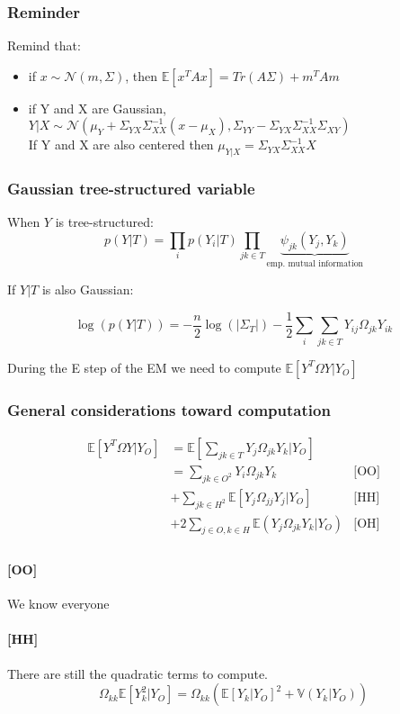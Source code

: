 \documentclass[11pt,a4paper]{article}
\newcommand{\Esp}{\mathds{E}}
\begin{document}
\subsubsection{Reminder}
Remind that:
\begin{itemize}
\item if $x\sim\mathcal{N}(m, \Sigma)$, then
$\Esp[x^TAx] = Tr(A\Sigma) + m^TAm$
\item if Y and X are Gaussian, $Y|X \sim \mathcal{N}(\mu_Y+\Sigma_{YX}\Sigma_{XX}^{-1}(x-\mu_X) , \Sigma_{YY} - \Sigma_{YX}\Sigma_{XX}^{-1}\Sigma_{XY})$\\
If Y and X are also centered then $\mu_{Y|X} = \Sigma_{YX}\Sigma_{XX}^{-1} X$
\end{itemize}


\subsubsection{Gaussian tree-structured variable}
When $Y$ is tree-structured:
$$ p(Y|T) = \prod_i  p(Y_i|T) \prod_{jk\in T} \underbrace{\psi_{jk}(Y_j,Y_k)}_{\text{emp. mutual  information}}$$

If $Y|T$ is also Gaussian:

$$\log(p(Y|T)) = -\frac{n}{2}\log(|\Sigma_T|) - \frac{1}{2} \sum_i\sum_{jk\in T} Y_{ij} \Omega_{jk} Y_{ik}$$

During the E step of the EM we need to compute $\Esp[Y^T\Omega Y|Y_O]$
\subsubsection{General considerations toward computation}
\begin{align*}
 \Esp[Y^T\Omega Y|Y_O] &=\Esp\left[\sum_{jk\in T } Y_j\Omega_{jk}Y_k|Y_O\right]&\\
& = \sum_{jk\in O^2} Y_i\Omega_{jk} Y_k & \text{[OO]}\\
&+\sum_{jk \in H^2} \Esp[Y_j\Omega_{jj}Y_j|Y_O] & \text{[HH]} \\
&+2 \sum_{j\in O, k \in H} \Esp(Y_j\Omega_{jk} Y_k |Y_O) & \text{[OH]}\\
\end{align*}

\paragraph{[OO]} We know everyone
\paragraph{[HH]} There are still the quadratic terms to compute. 
$$ \Omega_{kk} \Esp[Y_k^2|Y_O] = \Omega_{kk} \left( \Esp [Y_k|Y_O]^2 + \mathds{V}(Y_k|Y_O)\right)$$
\end{document}
